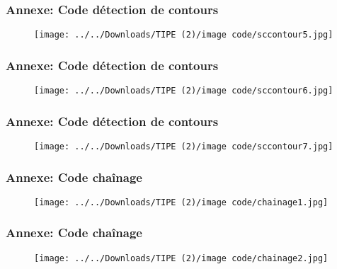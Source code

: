 \documentclass{beamer}
\begin{document}
\begin{frame}[fragile]
\frametitle{Annexe: Code détection de contours}
\begin{figure}[h]
    \begin{minipage}[c]{.46\linewidth}
        \centering
        \texttt{[image: ../../Downloads/TIPE (2)/image code/sccontour5.jpg]}

    \end{minipage}
\end{figure}
\end{frame}

\begin{frame}[fragile]
\frametitle{Annexe: Code détection de contours}
\begin{figure}[h]
    \begin{minipage}[c]{.46\linewidth}
        \centering
        \texttt{[image: ../../Downloads/TIPE (2)/image code/sccontour6.jpg]}

    \end{minipage}
\end{figure}
\end{frame}

\begin{frame}[fragile]
\frametitle{Annexe: Code détection de contours}
\begin{figure}[h]
    \begin{minipage}[c]{.46\linewidth}
        \centering
        \texttt{[image: ../../Downloads/TIPE (2)/image code/sccontour7.jpg]}

    \end{minipage}
\end{figure}
\end{frame}

\begin{frame}[fragile]
\frametitle{Annexe: Code chaînage}
\begin{figure}[h]
    \begin{minipage}[c]{.46\linewidth}
        \centering
        \texttt{[image: ../../Downloads/TIPE (2)/image code/chainage1.jpg]}

    \end{minipage}
\end{figure}
\end{frame}


\begin{frame}[fragile]
\frametitle{Annexe: Code chaînage}
\begin{figure}[h]
    \begin{minipage}[c]{.46\linewidth}
        \centering
        \texttt{[image: ../../Downloads/TIPE (2)/image code/chainage2.jpg]}

    \end{minipage}
\end{figure}
\end{frame}
\end{document}
